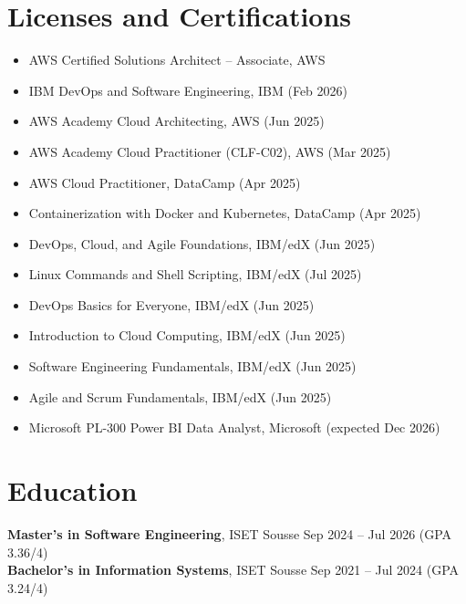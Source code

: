 \documentclass[a4paper,10pt]{article}
\begin{document}
\section*{Licenses and Certifications}
\begin{itemize}
  \item AWS Certified Solutions Architect -- Associate, AWS
  \item IBM DevOps and Software Engineering, IBM (Feb 2026)
  \item AWS Academy Cloud Architecting, AWS (Jun 2025)
  \item AWS Academy Cloud Practitioner (CLF-C02), AWS (Mar 2025)
  \item AWS Cloud Practitioner, DataCamp (Apr 2025)
  \item Containerization with Docker and Kubernetes, DataCamp (Apr 2025)
  \item DevOps, Cloud, and Agile Foundations, IBM/edX (Jun 2025)
  \item Linux Commands and Shell Scripting, IBM/edX (Jul 2025)
  \item DevOps Basics for Everyone, IBM/edX (Jun 2025)
  \item Introduction to Cloud Computing, IBM/edX (Jun 2025)
  \item Software Engineering Fundamentals, IBM/edX (Jun 2025)
  \item Agile and Scrum Fundamentals, IBM/edX (Jun 2025)
  \item Microsoft PL-300 Power BI Data Analyst, Microsoft (expected Dec 2026)
\end{itemize}

\section*{Education}
\textbf{Master's in Software Engineering}, ISET Sousse \hfill Sep 2024 -- Jul 2026 (GPA 3.36/4)\\
\textbf{Bachelor's in Information Systems}, ISET Sousse \hfill Sep 2021 -- Jul 2024 (GPA 3.24/4)
\end{document}
